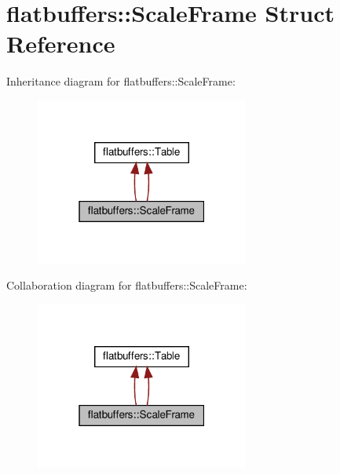 \hypertarget{structflatbuffers_1_1ScaleFrame}{}\section{flatbuffers\+:\+:Scale\+Frame Struct Reference}
\label{structflatbuffers_1_1ScaleFrame}


Inheritance diagram for flatbuffers\+:\+:Scale\+Frame\+:
\nopagebreak
\begin{figure}[H]
\begin{center}
\leavevmode
\includegraphics[width=199pt]{structflatbuffers_1_1ScaleFrame__inherit__graph}
\end{center}
\end{figure}


Collaboration diagram for flatbuffers\+:\+:Scale\+Frame\+:
\nopagebreak
\begin{figure}[H]
\begin{center}
\leavevmode
\includegraphics[width=199pt]{structflatbuffers_1_1ScaleFrame__coll__graph}
\end{center}
\end{figure}
